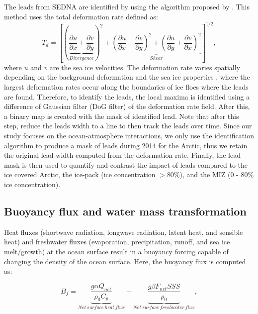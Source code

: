 \documentclass[lineno,sn-basic]{sn-jnl}%
\begin{document}
The leads from SEDNA are identified by using the algorithm proposed by \citet{Hutter_identification_2019}. This method uses the total deformation rate defined as: 
\begin{equation}
    T_d = \left[\left(\underbrace{\frac{\partial u}{\partial x} +\frac{\partial v}{\partial y}}_{Divergence}\right)^2 + \underbrace{\left(\frac{\partial u}{\partial x} - \frac{\partial v}{\partial y}\right)^2+ \left(\frac{\partial u}{\partial y} + \frac{\partial v}{\partial x}\right)^2}_{Shear}\right]^{1/2},
\end{equation}
where $u$ and $v$ are the sea ice velocities. The deformation rate varies spatially depending on the background deformation and the sea ice properties \citep{Reiser_LKF_2020}, where the largest deformation rates occur along the boundaries of ice floes where the leads are found. Therefore, to identify the leads, the local maxima is identified using a difference of Gaussian filter (DoG filter) of the deformation rate field. After this, a binary map is created with the mask of identified lead. Note that after this step, \citet{Hutter_identification_2019} reduce the leads width to a line to then track the leads over time. Since our study focuses on the ocean-atmosphere interactions, we only use the identification algorithm to produce a mask of leads during 2014 for the Arctic, thus we retain the original lead width computed from the deformation rate. Finally, the lead mask is then used to quantify and contrast the impact of leads compared to the ice covered Arctic, the ice-pack (ice concentration $> 80\%$), and the MIZ (0 - 80\% ice concentration).

\subsection*{Buoyancy flux and water mass transformation}
 
Heat fluxes (shortwave radiation, longwave radiation, latent heat, and sensible heat) and freshwater fluxes (evaporation, precipitation, runoff, and sea ice melt/growth) at the ocean surface result in a buoyancy forcing capable of changing the density of the ocean surface. Here, the buoyancy flux is computed as:

\begin{equation}
    B_f = \underbrace{\frac{g \alpha Q_{net}}{\rho_0 C_p}}_{Net\ surface\ heat\ flux} - \underbrace{\frac{g \beta F_{net} SSS }{\rho_0}}_{Net\ surface\ freshwater\ flux},
\end{equation}
\end{document}
